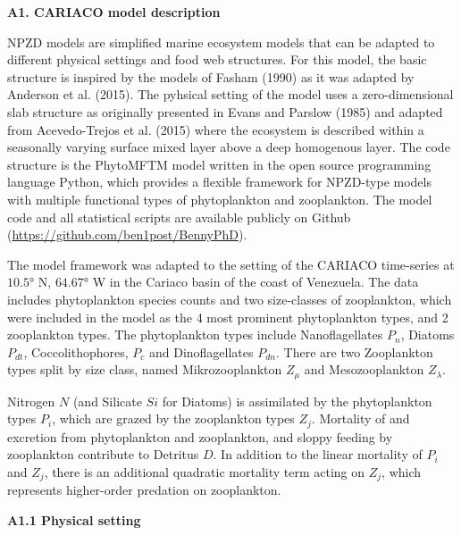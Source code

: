 \documentclass[11pt,letterpaper,english]{article}
\begin{document}
\newcommand{\etal}{{\em et al.}}
\newcommand{\ux}{{\underline{x}}}
\newcommand{\tdt}{{t}} 

{\bf {\large A1. CARIACO model description}} 

NPZD models are simplified marine ecosystem models that can be adapted to different physical settings and food web structures. For this model, the basic structure is inspired by the models of Fasham (1990) as it was adapted by Anderson et al. (2015). The pyhsical setting of the model uses a zero-dimensional slab structure as originally presented in Evans and Parslow (1985) and adapted from Acevedo-Trejos et al. (2015) where the ecosystem is described within a seasonally varying surface mixed layer above a deep homogenous layer. The code structure is the PhytoMFTM model written in the open source programming language Python, which provides a flexible framework for NPZD-type models with multiple functional types of phytoplankton and zooplankton. The model code and all statistical scripts are available publicly on Github (\url{https://github.com/ben1post/BennyPhD}).

The model framework was adapted to the setting of the CARIACO time-series at $10.5°$ N, $64.67°$ W in the Cariaco basin of the coast of Venezuela. The data includes phytoplankton species counts and two size-classes of zooplankton, which were included in the model as the 4 most prominent phytoplankton types, and 2 zooplankton types. The phytoplankton types include Nanoflagellates $P_{n}$, Diatoms $P_{dt}$, Coccolithophores, $P_{c}$ and Dinoflagellates $P_{dn}$. There are two Zooplankton types split by size class, named Mikrozooplankton $Z_{\mu}$ and Mesozooplankton $Z_{\lambda}$. 

Nitrogen $N$ (and Silicate $Si$ for Diatoms) is assimilated by the phytoplankton types $P_i$, which are grazed by the zooplankton types $Z_j$. Mortality of and excretion from phytoplankton and zooplankton, and sloppy feeding by zooplankton contribute to Detritus $D$. In addition to the linear mortality of $P_i$ and $Z_j$, there is an additional quadratic mortality term acting on $Z_j$, which represents higher-order predation on zooplankton.

{\bf {\large A1.1 Physical setting}}
\end{document}
